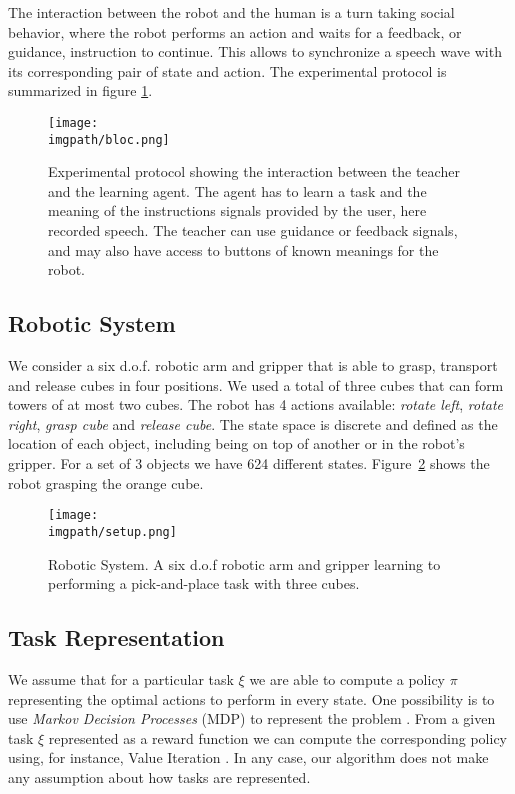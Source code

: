 The interaction between the robot and the human is a turn taking social behavior, where the robot performs an action and waits for a feedback, or guidance, instruction to continue. This allows to synchronize a speech wave with its corresponding pair of state and action. The experimental protocol is summarized in figure \ref{fig:lfui:bloc}.

\begin{figure}[!ht]
  \centering
  \texttt{[image: \\imgpath/bloc.png]}
  \caption{Experimental protocol showing the interaction between the teacher and the learning agent. The agent has to learn a task and the meaning of the instructions signals provided by the user, here recorded speech. The teacher can use guidance or feedback signals, and may also have access to buttons of known meanings for the robot.}
  \label{fig:lfui:bloc}    
\end{figure}

\subsection{Robotic System}

We consider a six d.o.f. robotic arm and gripper that is able to grasp, transport and release cubes in four positions. We used a total of three cubes that can form towers of at most two cubes.  The robot has 4 actions available: \textit{rotate left}, \textit{rotate right}, \textit{grasp cube} and \textit{release cube}. The state space is discrete and defined as the location of each object, including being on top of another or in the robot's gripper. For a set of 3 objects we have 624 different states. Figure~\ref{fig:lfui:setup} shows the robot grasping the orange cube. 

\begin{figure}[!ht]
  \centering
  \texttt{[image: \\imgpath/setup.png]}
  \caption{Robotic System. A six d.o.f robotic arm and gripper learning to performing a pick-and-place task with three cubes.}
  \label{fig:lfui:setup}
\end{figure}

\subsection{Task Representation}

We assume that for a particular task $\xi$ we are able to compute a policy $\pi$ representing the optimal actions to perform in every state. One possibility is to use \textit{Markov Decision Processes} (MDP) to represent the problem \cite{sutton1998reinforcement}. From a given task $\xi$ represented as a reward function we can compute the corresponding policy using, for instance, Value Iteration \cite{sutton1998reinforcement}. In any case, our algorithm does not make any assumption about how tasks are represented.

